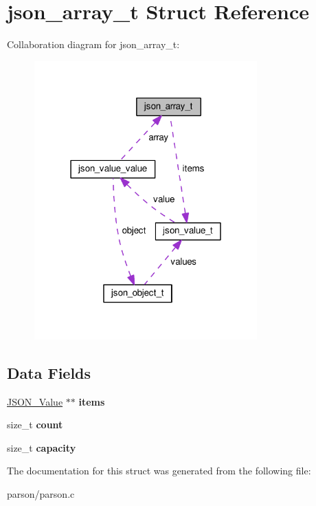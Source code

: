 \hypertarget{structjson__array__t}{\section{json\-\_\-array\-\_\-t Struct Reference}
\label{structjson__array__t}
}


Collaboration diagram for json\-\_\-array\-\_\-t\-:\nopagebreak
\begin{figure}[H]
\begin{center}
\leavevmode
\includegraphics[width=243pt]{structjson__array__t__coll__graph}
\end{center}
\end{figure}
\subsection*{Data Fields}
\begin{DoxyCompactItemize}
\item 
\hypertarget{structjson__array__t_a6834c444c0eb10e41117803475c52e12}{\hyperlink{structjson__value__t}{J\-S\-O\-N\-\_\-\-Value} $\ast$$\ast$ {\bfseries items}}\label{structjson__array__t_a6834c444c0eb10e41117803475c52e12}

\item 
\hypertarget{structjson__array__t_a76d971a3c552bc58ba9f0d5fceae9806}{size\-\_\-t {\bfseries count}}\label{structjson__array__t_a76d971a3c552bc58ba9f0d5fceae9806}

\item 
\hypertarget{structjson__array__t_ad721fc6ca6a3d6ba3bc506576622aab0}{size\-\_\-t {\bfseries capacity}}\label{structjson__array__t_ad721fc6ca6a3d6ba3bc506576622aab0}

\end{DoxyCompactItemize}


The documentation for this struct was generated from the following file\-:\begin{DoxyCompactItemize}
\item 
parson/parson.\-c\end{DoxyCompactItemize}
